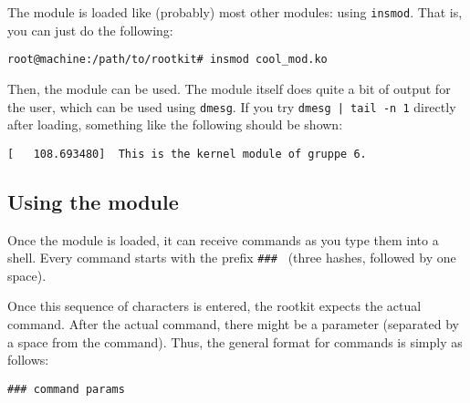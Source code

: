 \documentclass[10pt, letterpaper]{article}
\begin{document}
The module is loaded like (probably) most other modules: using \texttt{insmod}. That is, you can just do the following:

\begin{verbatim}
root@machine:/path/to/rootkit# insmod cool_mod.ko
\end{verbatim}

Then, the module can be used. The module itself does quite a bit of output for the user, which can be used using \texttt{dmesg}. If you try \texttt{dmesg | tail -n 1} directly after loading, something like the following should be shown:

\begin{verbatim}
[   108.693480]  This is the kernel module of gruppe 6.
\end{verbatim}

\subsection{Using the module}

\label{sec:using-the-module}

Once the module is loaded, it can receive commands as you type them into a shell. Every command starts with the prefix \texttt{\#\#\# } (three hashes, followed by one space).

Once this sequence of characters is entered, the rootkit expects the actual command. After the actual command, there might be a parameter (separated by a space from the command). Thus, the general format for commands is simply as follows:

\begin{verbatim}
### command params
\end{verbatim}
\end{document}
